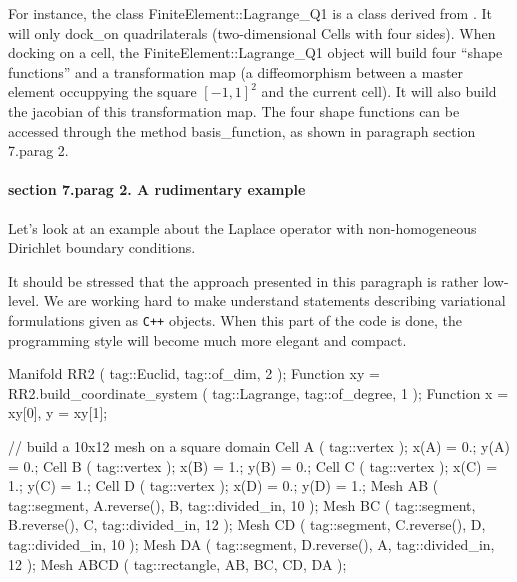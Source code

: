 For instance, the class {\codett FiniteElement::Lagrange\_Q1} is a class derived from
\hfil{}.
It will only {\codett dock\_on} quadrilaterals (two-dimensional {\codett Cell}s
with four sides).
When docking on a cell, the {\codett FiniteElement::Lagrange\_Q1} object will build four
``shape functions'' and a transformation map (a diffeomorphism between a master element
occuppying the square $ [-1, 1]^2 $ and the current cell).
It will also build the jacobian of this transformation map.
The four shape functions can be accessed through the method {\codett basis\_function},
as shown in paragraph \numb section 7.\numb parag 2.


\paragraph{\numb section 7.\numb parag 2. A rudimentary example}

Let's look at an example about the Laplace operator with non-homogeneous Dirichlet
boundary conditions.

It should be stressed that the approach presented in this paragraph is rather low-level.
We are working hard to make {\maniFEM} understand statements describing variational
formulations given as {\tt C++} objects.
When this part of the code is done, the programming style will become much more elegant
and compact.

\vfil\eject
\verbatim
   Manifold RR2 ( tag::Euclid, tag::of_dim, 2 );
   Function xy = RR2.build_coordinate_system ( tag::Lagrange, tag::of_degree, 1 );
   Function x = xy[0],  y = xy[1];

   // build a 10x12 mesh on a square domain
   Cell A ( tag::vertex );  x(A) = 0.;   y(A) = 0.;
   Cell B ( tag::vertex );  x(B) = 1.;   y(B) = 0.;
   Cell C ( tag::vertex );  x(C) = 1.;   y(C) = 1.;
   Cell D ( tag::vertex );  x(D) = 0.;   y(D) = 1.;
   Mesh AB ( tag::segment, A.reverse(), B, tag::divided_in, 10 );
   Mesh BC ( tag::segment, B.reverse(), C, tag::divided_in, 12 );
   Mesh CD ( tag::segment, C.reverse(), D, tag::divided_in, 10 );
   Mesh DA ( tag::segment, D.reverse(), A, tag::divided_in, 12 );
   Mesh ABCD ( tag::rectangle, AB, BC, CD, DA );


